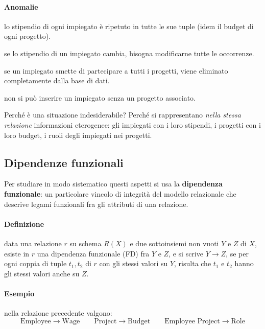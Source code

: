 \documentclass[a4paper,12pt]{article}
\begin{document}
\paragraph{Anomalie}
\begin{description}[style=nextline]
  \item[Ridondanza] lo stipendio di ogni impiegato è ripetuto in tutte le sue
    tuple (idem il budget di ogni progetto).
  \item[Anomalia di aggiornamento] se lo stipendio di un impiegato cambia,
    bisogna modificarne tutte le occorrenze.
  \item[Anomalia di cancellazione] se un impiegato smette di partecipare a
    tutti i progetti, viene eliminato completamente dalla base di dati.
  \item[Anomalia di inserimento] non si può inserire un impiegato senza un
    progetto associato.
\end{description}
Perché è una situazione indesiderabile? Perché si rappresentano \emph{nella
stessa relazione} informazioni eterogenee: gli impiegati con i loro stipendi,
i progetti con i loro budget, i ruoli degli impiegati nei progetti.

\subsection{Dipendenze funzionali}

Per studiare in modo sistematico questi aspetti si usa la \textbf{dipendenza
funzionale}: un particolare vincolo di integrità del modello relazionale che
descrive legami funzionali fra gli attributi di una relazione.

\paragraph{Definizione} data una relazione $r$ su schema $R(X)$ e due
sottoinsiemi non vuoti $Y$ e $Z$ di $X$, esiste in $r$ una dipendenza
funzionale (FD) fra $Y$ e $Z$, e si scrive $Y \to Z$, se per ogni coppia di
tuple $t_1, t_2$ di $r$ con gli stessi valori su $Y$, risulta che $t_1$ e
$t_2$ hanno gli stessi valori anche su $Z$.

\paragraph{Esempio} nella relazione precedente valgono:
\[
\text{Employee} \to \text{Wage} \qquad
\text{Project} \to \text{Budget} \qquad
\text{Employee Project} \to \text{Role}
\]
\end{document}
